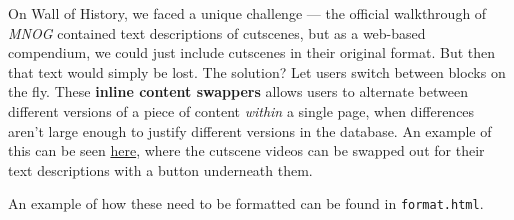 \documentclass[11pt]{article} %
\begin{document}
On Wall of History, we faced a unique challenge — the official walkthrough of \textit{MNOG} contained text descriptions of cutscenes, but as a web-based compendium, we could just include cutscenes in their original format. But then that text would simply be lost. The solution? Let users switch between blocks on the fly. These \textbf{inline content swappers} allows users to alternate between different versions of a piece of content \textit{within} a single page, when differences aren’t large enough to justify different versions in the database. An example of this can be seen \href{https://wallofhistory.com/read/?id=RQ1P7J&v=1&lang=en}{here}, where the cutscene videos can be swapped out for their text descriptions with a button underneath them.

An example of how these need to be formatted can be found in \texttt{format.html}.
\end{document}
